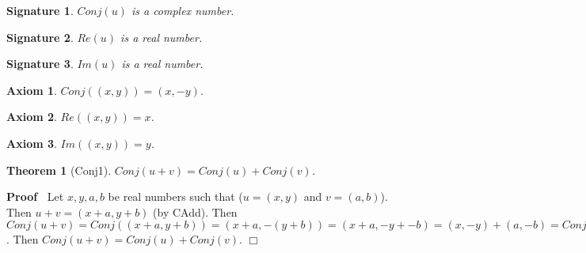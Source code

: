 \documentclass{article}
\newenvironment{forthel}{\begin{leftbar}}{\end{leftbar}}
\newenvironment{proof}{\noindent\textbf{Proof\ }}{\hspace*{\fill}$\Box$\medskip}
\newtheorem{axiom}{Axiom}
\newtheorem{theorem}{Theorem}
\newtheorem{signature}{Signature}
\newcommand{\cadd}{+}
\begin{document}
\begin{forthel}


\begin{signature} $Conj(u)$ is a complex number.

\end{signature}
\begin{signature} $Re(u)$ is a real number.

\end{signature}
\begin{signature} $Im(u)$ is a real number.

\end{signature}
\begin{axiom} $Conj((x,y)) = (x,-y)$.

\end{axiom}
\begin{axiom} $Re((x,y)) = x$.

\end{axiom}
\begin{axiom} $Im((x,y)) = y$.

\end{axiom}

\begin{theorem}[Conj1] $Conj(u \cadd v) = Conj(u)  \cadd  Conj(v)$.
\end{theorem}\begin{proof}
 	Let $x,y,a,b$ be real numbers such that ($u = (x,y)$ and $v = (a,b)$).\newline
Then $u \cadd v = (x+a,y+b)$ (by CAdd).\newline
Then $Conj(u  \cadd  v) = Conj((x+a,y+b)) = (x+a,-(y+b)) = (x+a, -y + -b) = (x,-y)  \cadd  (a,-b) = Conj(u)  \cadd  Conj(v)$.\newline
Then $Conj(u \cadd v) = Conj(u)  \cadd  Conj(v)$.
\end{proof}
		

\end{forthel}
\end{document}
